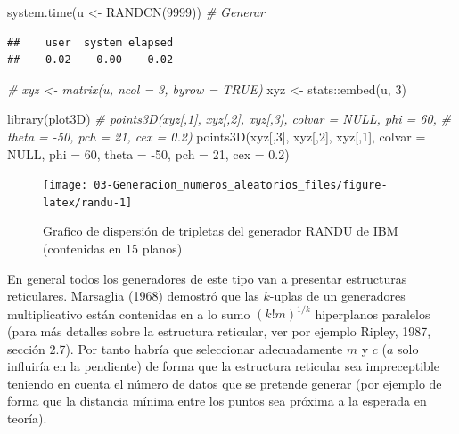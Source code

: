 \documentclass[
]{book}
\newenvironment{Shaded}{\begin{snugshade}}{\end{snugshade}}
\newcommand{\AttributeTok}[1]{\textcolor[rgb]{0.77,0.63,0.00}{#1}}
\newcommand{\CommentTok}[1]{\textcolor[rgb]{0.56,0.35,0.01}{\textit{#1}}}
\newcommand{\ConstantTok}[1]{\textcolor[rgb]{0.00,0.00,0.00}{#1}}
\newcommand{\DecValTok}[1]{\textcolor[rgb]{0.00,0.00,0.81}{#1}}
\newcommand{\FloatTok}[1]{\textcolor[rgb]{0.00,0.00,0.81}{#1}}
\newcommand{\FunctionTok}[1]{\textcolor[rgb]{0.00,0.00,0.00}{#1}}
\newcommand{\NormalTok}[1]{#1}
\newcommand{\OtherTok}[1]{\textcolor[rgb]{0.56,0.35,0.01}{#1}}
\newcommand{\SpecialCharTok}[1]{\textcolor[rgb]{0.00,0.00,0.00}{#1}}
\theoremstyle{break}
\theoremstyle{definition}
\theoremstyle{definition}
\theoremstyle{definition}
\theoremstyle{definition}
\theoremstyle{remark}
\begin{document}
\begin{Shaded}
\begin{Highlighting}[]
\FunctionTok{system.time}\NormalTok{(u }\OtherTok{\textless{}{-}} \FunctionTok{RANDCN}\NormalTok{(}\DecValTok{9999}\NormalTok{))  }\CommentTok{\# Generar}
\end{Highlighting}
\end{Shaded}

\begin{verbatim}
##    user  system elapsed 
##    0.02    0.00    0.02
\end{verbatim}

\begin{Shaded}
\begin{Highlighting}[]
\CommentTok{\# xyz \textless{}{-} matrix(u, ncol = 3, byrow = TRUE)}
\NormalTok{xyz }\OtherTok{\textless{}{-}}\NormalTok{ stats}\SpecialCharTok{::}\FunctionTok{embed}\NormalTok{(u, }\DecValTok{3}\NormalTok{)}

\FunctionTok{library}\NormalTok{(plot3D)}
\CommentTok{\# points3D(xyz[,1], xyz[,2], xyz[,3], colvar = NULL, phi = 60, }
\CommentTok{\#          theta = {-}50, pch = 21, cex = 0.2)}
\FunctionTok{points3D}\NormalTok{(xyz[,}\DecValTok{3}\NormalTok{], xyz[,}\DecValTok{2}\NormalTok{], xyz[,}\DecValTok{1}\NormalTok{], }\AttributeTok{colvar =} \ConstantTok{NULL}\NormalTok{, }\AttributeTok{phi =} \DecValTok{60}\NormalTok{, }
         \AttributeTok{theta =} \SpecialCharTok{{-}}\DecValTok{50}\NormalTok{, }\AttributeTok{pch =} \DecValTok{21}\NormalTok{, }\AttributeTok{cex =} \FloatTok{0.2}\NormalTok{)}
\end{Highlighting}
\end{Shaded}

\begin{figure}[!htb]

{\centering \texttt{[image: 03-Generacion\_numeros\_aleatorios\_files/figure-latex/randu-1]} 

}

\caption{Grafico de dispersión de tripletas del generador RANDU de IBM (contenidas en 15 planos)}\label{fig:randu}
\end{figure}

En general todos los generadores de este tipo van a presentar estructuras reticulares.
Marsaglia (1968) demostró que las \(k\)-uplas de un generadores multiplicativo están contenidas en a lo sumo \(\left(k!m\right)^{1/k}\) hiperplanos paralelos (para más detalles sobre la estructura reticular, ver por ejemplo Ripley, 1987, sección 2.7).
Por tanto habría que seleccionar adecuadamente \(m\) y \(c\) (\(a\) solo influiría en la pendiente) de forma que la estructura reticular sea impreceptible teniendo en cuenta el número de datos que se pretende generar (por ejemplo de forma que la distancia mínima entre los puntos sea próxima a la esperada en teoría).
\end{document}
